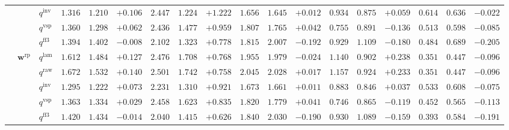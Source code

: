 \documentclass[eng]{kjas3}
\begin{document}
\begin{table}[t]
{\begin{tabular}{lll ccc ccc ccc ccc ccc}
 &  & $q^{\mathrm{inv}}$ & $1.316$ & $1.210$ & \cellcolor{posgreen!50}$+0.106$ & $2.447$ & $1.224$ & \cellcolor{posgreen!50}$+1.222$ & $1.656$ & $1.645$ & \cellcolor{posgreen!50}$+0.012$ & $0.934$ & $0.875$ & \cellcolor{posgreen!50}$+0.059$ & $0.614$ & $0.636$ & \cellcolor{negred!50}$-0.022$ \\
 &  & $q^{\mathrm{vsp}}$ & $1.360$ & $1.298$ & \cellcolor{posgreen!50}$+0.062$ & $2.436$ & $1.477$ & \cellcolor{posgreen!50}$+0.959$ & $1.807$ & $1.765$ & \cellcolor{posgreen!50}$+0.042$ & $0.755$ & $0.891$ & \cellcolor{negred!50}$-0.136$ & $0.513$ & $0.598$ & \cellcolor{negred!50}$-0.085$ \\
 &  & $q^{\mathrm{ff3}}$ & $1.394$ & $1.402$ & \cellcolor{negred!50}$-0.008$ & $2.102$ & $1.323$ & \cellcolor{posgreen!50}$+0.778$ & $1.815$ & $2.007$ & \cellcolor{negred!50}$-0.192$ & $0.929$ & $1.109$ & \cellcolor{negred!50}$-0.180$ & $0.484$ & $0.689$ & \cellcolor{negred!50}$-0.205$ \\
\cmidrule(lr){2-18}
 & $\mathbf{w}^{\mathrm{rp}}$ & $q^{\mathrm{lam}}$ & $1.612$ & $1.484$ & \cellcolor{posgreen!50}$+0.127$ & $2.476$ & $1.708$ & \cellcolor{posgreen!50}$+0.768$ & $1.955$ & $1.979$ & \cellcolor{negred!50}$-0.024$ & $1.140$ & $0.902$ & \cellcolor{posgreen!50}$+0.238$ & $0.351$ & $0.447$ & \cellcolor{negred!50}$-0.096$ \\
 &  & $q^{\mathrm{raw}}$ & $1.672$ & $1.532$ & \cellcolor{posgreen!50}$+0.140$ & $2.501$ & $1.742$ & \cellcolor{posgreen!50}$+0.758$ & $2.045$ & $2.028$ & \cellcolor{posgreen!50}$+0.017$ & $1.157$ & $0.924$ & \cellcolor{posgreen!50}$+0.233$ & $0.351$ & $0.447$ & \cellcolor{negred!50}$-0.096$ \\
 &  & $q^{\mathrm{inv}}$ & $1.295$ & $1.222$ & \cellcolor{posgreen!50}$+0.073$ & $2.231$ & $1.310$ & \cellcolor{posgreen!50}$+0.921$ & $1.673$ & $1.661$ & \cellcolor{posgreen!50}$+0.011$ & $0.883$ & $0.846$ & \cellcolor{posgreen!50}$+0.037$ & $0.533$ & $0.608$ & \cellcolor{negred!50}$-0.075$ \\
 &  & $q^{\mathrm{vsp}}$ & $1.363$ & $1.334$ & \cellcolor{posgreen!50}$+0.029$ & $2.458$ & $1.623$ & \cellcolor{posgreen!50}$+0.835$ & $1.820$ & $1.779$ & \cellcolor{posgreen!50}$+0.041$ & $0.746$ & $0.865$ & \cellcolor{negred!50}$-0.119$ & $0.452$ & $0.565$ & \cellcolor{negred!50}$-0.113$ \\
 &  & $q^{\mathrm{ff3}}$ & $1.420$ & $1.434$ & \cellcolor{negred!50}$-0.014$ & $2.040$ & $1.415$ & \cellcolor{posgreen!50}$+0.626$ & $1.840$ & $2.030$ & \cellcolor{negred!50}$-0.190$ & $0.930$ & $1.089$ & \cellcolor{negred!50}$-0.159$ & $0.393$ & $0.584$ & \cellcolor{negred!50}$-0.191$ \\
\bottomrule
\end{tabular}}
\end{table}
\end{document}
